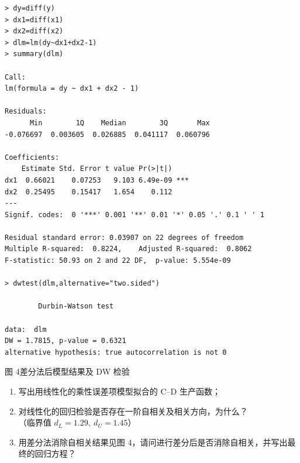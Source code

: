 \documentclass[UTF8,fontset=fandol,zihao=-4,a4paper]{ctexart}
\begin{document}
{\fontsize{8.2pt}{9.2pt}\selectfont
\begin{Verbatim}
> dy=diff(y)
> dx1=diff(x1)
> dx2=diff(x2)
> dlm=lm(dy~dx1+dx2-1)
> summary(dlm)

Call:
lm(formula = dy ~ dx1 + dx2 - 1)

Residuals:
      Min        1Q    Median        3Q       Max
-0.076697  0.003605  0.026885  0.041117  0.060796

Coefficients:
    Estimate Std. Error t value Pr(>|t|)
dx1  0.66021    0.07253   9.103 6.49e-09 ***
dx2  0.25495    0.15417   1.654    0.112
---
Signif. codes:  0 '***' 0.001 '**' 0.01 '*' 0.05 '.' 0.1 ' ' 1

Residual standard error: 0.03907 on 22 degrees of freedom
Multiple R-squared:  0.8224,    Adjusted R-squared:  0.8062
F-statistic: 50.93 on 2 and 22 DF,  p-value: 5.554e-09

> dwtest(dlm,alternative="two.sided")

        Durbin-Watson test

data:  dlm
DW = 1.7815, p-value = 0.6321
alternative hypothesis: true autocorrelation is not 0
\end{Verbatim}
\begin{center}
图 4\quad 差分法后模型结果及 DW 检验
\end{center}
}

\begin{enumerate}[label=(\arabic*),leftmargin=2.5em,itemsep=0.45em,topsep=0pt]
  \item 写出用线性化的乘性误差项模型拟合的 C--D 生产函数；
  \item 对线性化的回归检验是否存在一阶自相关及相关方向，为什么？\\
  （临界值 $d_L=1.29,\ d_U=1.45$）
  \item 用差分法消除自相关结果见图 4，请问进行差分后是否消除自相关，并写出最终的回归方程？
\end{enumerate}
\end{document}
